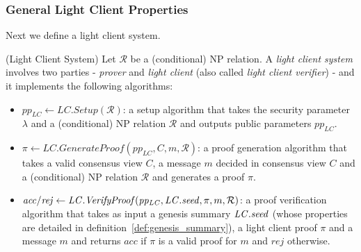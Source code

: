 \subsubsection{General Light Client Properties}

\noindent Next we define a light client system. 
\label{sec:soundness}
  
\begin{definition}(Light Client System)
\label{scheme_light_client} Let $\mathcal{R}$ be a (conditional) NP relation. A \emph{light client system} involves 
two parties - \emph{prover} and \emph{light client} (also called \emph{light client verifier}) - and it implements the following algorithms:
\begin{itemize}
\item $\mathit{pp_{\mathit{LC}}} \leftarrow \mathit{LC.Setup}(\mathcal{R})$: 
a setup algorithm that takes the security parameter $\lambda$ and a (conditional) NP relation $\mathcal{R}$ 
and outputs public parameters $\mathit{pp_{\mathit{LC}}}$.
\item $\pi \leftarrow \mathit{LC.GenerateProof}(\mathit{pp_{\mathit{LC}}}, C, m, \mathcal{R})$: a proof 
generation algorithm that takes a valid consensus view $C$, a message $m$ decided in consensus view $C$ 
and a (conditional) NP relation $\mathcal{R}$ and generates a proof $\pi$.
\item $\mathit{acc}/\mathit{rej}  \leftarrow  \mathit{LC.VerifyProof}(\mathit{pp_{\mathit{LC}}}, \mathit{LC.seed}, \pi, m, \mathcal{R})$: 
a proof verification algorithm that takes as input a genesis summary $\mathit{LC.seed}$ (whose properties are detailed in 
definition~\ref{def:genesis_summary}), a light client proof $\pi$ and a message $m$ and returns $\mathit{acc}$ if $\pi$ is a valid 
proof for $m$ and $\mathit{rej}$ otherwise.
\end{itemize}


\end{definition}
